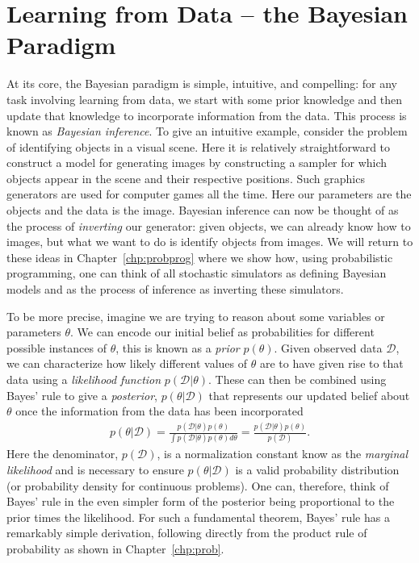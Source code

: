 
\section{Learning from Data -- the Bayesian Paradigm}
\label{sec:bayes:paradigm}

At its core, the Bayesian paradigm is simple, intuitive, and compelling: for any task involving
learning from data, we start with some prior knowledge and then update that knowledge to
incorporate information from the data.  This process is known as \emph{Bayesian inference}.
To give an intuitive example, consider the problem of identifying objects in
a visual scene.  Here it is relatively straightforward to construct a model for generating images by
constructing a sampler for which objects appear in the scene and their respective positions.  Such
graphics generators are used for computer games all the time.  Here our parameters are the objects and
the data is the image.  Bayesian inference can now be thought of as the process of \emph{inverting} our generator:
given objects, we can already know how to images, but what we want to do is identify objects from images.  We will return
to these ideas in Chapter~\ref{chp:probprog} where we show how, using probabilistic programming,
one can think of all stochastic simulators as defining Bayesian models and as the process of inference as
inverting these simulators.

To be more precise, imagine we are trying to reason about some variables
or parameters $\theta$.  We can encode our initial belief as probabilities for different
possible instances of $\theta$, this is known as a \emph{prior} $p(\theta)$.  Given observed data
$\mathcal{D}$, we can characterize how likely different values of $\theta$ are to have given rise
to that data using a \emph{likelihood function} $p(\mathcal{D}|\theta)$.  These can then be
combined using Bayes' rule to give a \emph{posterior}, $p(\theta | \mathcal{D})$ that 
represents our updated belief about $\theta$ once the information from the data has been
incorporated
\begin{align}
	\label{eq:bayes:bayes}
	p(\theta | \mathcal{D}) = \frac{p(\mathcal{D} | \theta)p(\theta)}{\int p(\mathcal{D} | \theta)p(\theta) d\theta} 
	= \frac{p(\mathcal{D} | \theta)p(\theta)}{p(\mathcal{D})}.
\end{align}
Here the denominator, $p(\mathcal{D})$, is a normalization constant know as the \emph{marginal
	likelihood} and is necessary to ensure $p(\theta | \mathcal{D})$ is a valid probability distribution
(or probability density for continuous problems).  One can, therefore, think of Bayes' rule in the even
simpler form of the posterior being proportional to the prior times the likelihood.
For such a fundamental theorem, Bayes' rule has a remarkably simple derivation, following directly
from the product rule of probability as shown in Chapter~\ref{chp:prob}.

